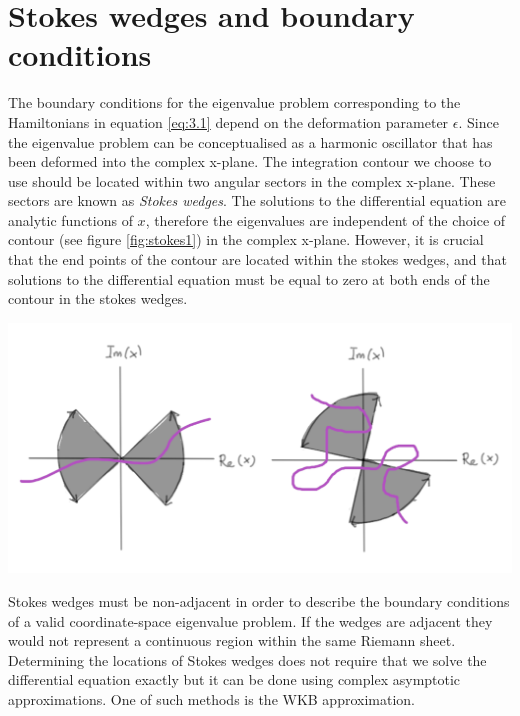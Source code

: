 \documentclass[12pt, a4paper]{report}
\newenvironment{Figure}
    {\par\medskip\noindent\minipage{\linewidth}}
    {\endminipage\par\medskip}
\begin{document}
\section{Stokes wedges and boundary conditions}\label{Stokes}
The boundary conditions for the eigenvalue problem corresponding to the Hamiltonians in equation \ref{eq:3.1} depend on the deformation parameter $\epsilon$\cite{MakingSense}. Since the eigenvalue problem can be conceptualised as a harmonic oscillator that has been deformed into the complex x-plane\cite{AnalyticContinuation}. The integration contour we choose to use should be located within two angular sectors in the complex x-plane. These sectors are known as \emph{Stokes wedges}\cite{MakingSense}. 
The solutions to the differential equation are analytic functions of $x$\cite{BenderOrszag}, therefore the eigenvalues are independent of the choice of contour (see figure \ref{fig:stokes1}) in the complex x-plane\cite{PTsymmetricQM}\cite{Sorrell}. However, it is crucial that the end points of the contour are located within the stokes wedges, and that solutions to the differential equation must be equal to zero at both ends of the contour in the stokes wedges\cite{Faria1}. 
\begin{Figure}
\centering
\includegraphics[width=.9\linewidth]{stokes1.pdf}
\label{fig:stokes1}
\end{Figure}
Stokes wedges must be non-adjacent in order to describe the boundary conditions of a valid coordinate-space eigenvalue problem. If the wedges are adjacent they would not represent a continuous region within the same Riemann sheet.
Determining the locations of Stokes wedges does not require that we solve the differential equation exactly but it can be done using complex asymptotic approximations\cite{PTsymmetricQM}. One of such methods is the WKB approximation. 
\end{document}
